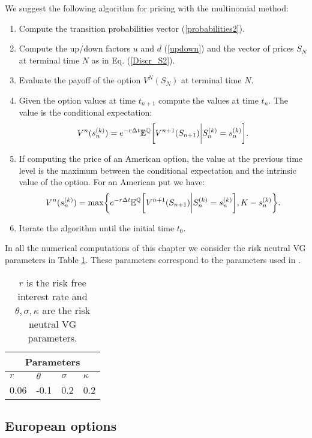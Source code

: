 We suggest the following algorithm for pricing with the multinomial method:
\begin{enumerate}
 \item Compute the transition probabilities vector (\ref{probabilities2}). 
 \item Compute the up/down factors $u$ and $d$ (\ref{updown}) and the vector of prices $S_N$ at terminal time $N$ as in Eq. (\ref{Discr_S2}).
 \item Evaluate the payoff of the option $V^N(S_N)$ at terminal time $N$.
 \item Given the option values at time $t_{n+1}$ compute the values at time $t_n$. The value is the conditional expectation:
 \begin{equation}
 V^n(s^{(k)}_n) = e^{-r\Delta t} \mathbb{E}^{\mathbb{Q}} \biggl[ V^{n+1}(S_{n+1}) \bigg| S^{(k)}_n = s^{(k)}_n \biggr]. 
\end{equation}
 \item If computing the price of an American option, the value at the previous time level is the maximum between the conditional expectation and
 the intrinsic value of the option. For an American put we have:
 \begin{equation}
 V^n(s^{(k)}_n) = \max \biggr \{ e^{-r\Delta t} \mathbb{E}^{\mathbb{Q}} \biggl[ V^{n+1}(S_{n+1}) \bigg| S^{(k)}_n = s^{(k)}_n \biggr] , K-s^{(k)}_n \biggr \}. 
\end{equation}	
 \item Iterate the algorithm until the initial time $t_0$. 
\end{enumerate}

In all the numerical computations of this chapter we consider the risk neutral VG parameters in Table \ref{sample-table}. These parameters correspond to the parameters used 
in \cite{Canta2}.

\begin{table}[!h]
\centering
{\begin{tabular}{llll}
\toprule
 \multicolumn{4}{c}{Parameters} \\
\midrule
$r$ & $\theta$ & $\sigma$ & $\kappa$ \\ 
0.06 & -0.1 & 0.2 & 0.2 \\
\bottomrule
\end{tabular}}
\caption{$r$ is the risk free interest rate and $\theta, \sigma, \kappa$ are the risk neutral VG parameters.}
\label{sample-table}
\end{table}



\subsection{European options}


